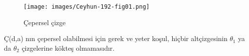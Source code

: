 \documentclass[11pt]{amsbook}
\begin{document}
\begin{figure}
    \centering
    \texttt{[image: images/Ceyhun-192-fig01.png]}
    \caption{Çepersel çizge}
\end{figure}

\begin{theorem}

  Ç(d,a) nın çepersel olabilmesi için gerek ve yeter koşul, hiçbir altçizgesinin 
  $\theta_{1}$ ya da $\theta_{2} $
  çizgelerine kökteş olmamasıdır.
  
 \end{theorem}
\end{document}
